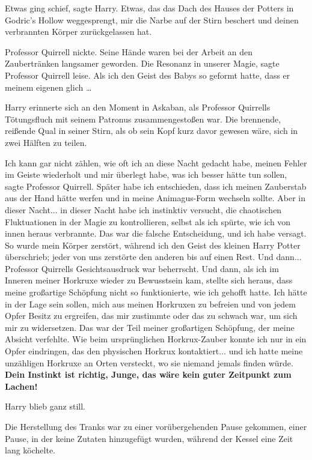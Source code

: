 Etwas ging schief\grqq{}, sagte Harry. \glqq{}Etwas, das das Dach des Hauses der
Potters in Godric's Hollow weggesprengt, mir die Narbe auf der Stirn beschert
und deinen verbrannten Körper zurückgelassen hat.\grqq{}

Professor Quirrell nickte. Seine Hände waren bei der Arbeit an den Zaubertränken
langsamer geworden. \glqq{}Die Resonanz in unserer Magie\grqq{}, sagte Professor
Quirrell leise. \glqq{}Als ich den Geist des Babys so geformt hatte, dass er
meinem eigenen glich …\grqq{}

Harry erinnerte sich an den Moment in Askaban, als Professor Quirrells
Tötungsfluch mit seinem Patronus zusammengestoßen war. Die brennende, reißende
Qual in seiner Stirn, als ob sein Kopf kurz davor gewesen wäre, sich in zwei
Hälften zu teilen.

\glqq{}Ich kann gar nicht zählen, wie oft ich an diese Nacht gedacht habe, meinen
Fehler im Geiste wiederholt und mir überlegt habe, was ich besser hätte tun
sollen\grqq{}, sagte Professor Quirrell. \glqq{}Später habe ich entschieden, dass
ich meinen Zauberstab aus der Hand hätte werfen und in meine Animagus-Form
wechseln sollte. Aber in dieser Nacht... in dieser Nacht habe ich instinktiv
versucht, die chaotischen Fluktuationen in der Magie zu kontrollieren, selbst
als ich spürte, wie ich von innen heraus verbrannte. Das war die falsche
Entscheidung, und ich habe versagt. So wurde mein Körper zerstört, während ich
den Geist des kleinen Harry Potter überschrieb; jeder von uns zerstörte den
anderen bis auf einen Rest. Und dann...\grqq{} Professor Quirrells Gesichtsausdruck
war beherrscht. \glqq{}Und dann, als ich im Inneren meiner Horkruxe wieder zu
Bewusstsein kam, stellte sich heraus, dass meine großartige Schöpfung nicht so
funktionierte, wie ich gehofft hatte. Ich hätte in der Lage sein sollen, mich
aus meinen Horkruxen zu befreien und von jedem Opfer Besitz zu ergreifen, das
mir zustimmte oder das zu schwach war, um sich mir zu widersetzen. Das war der
Teil meiner großartigen Schöpfung, der meine Absicht verfehlte. Wie beim
ursprünglichen Horkrux-Zauber konnte ich nur in ein Opfer eindringen, das den
physischen Horkrux kontaktiert... und ich hatte meine unzähligen Horkruxe an
Orten versteckt, wo sie niemand jemals finden würde. \textbf{Dein Instinkt ist
richtig, Junge, das wäre kein guter Zeitpunkt zum Lachen!}\grqq{}

Harry blieb ganz still.

Die Herstellung des Tranks war zu einer vorübergehenden Pause gekommen, einer
Pause, in der keine Zutaten hinzugefügt wurden, während der Kessel eine Zeit
lang köchelte.

